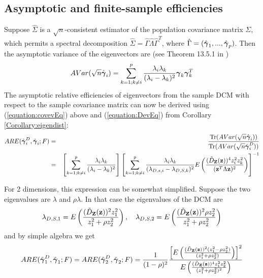 \documentclass[fleqn,11pt]{article}
\DeclareMathOperator*{\Tr}{Tr}
\begin{document}
\subsection{Asymptotic and finite-sample efficiencies}
Suppose $\hat\Sigma$ is a $\sqrt n$-consistent estimator of the population covariance matrix $\Sigma$, which permits a spectral decomposition $ \hat\Sigma = \hat\Gamma \hat\Lambda \hat\Gamma^T $, where $\hat\Gamma = (\hat{{\boldsymbol{\gamma}}}_1,...,\hat{{\boldsymbol{\gamma}}}_p)$. Then the asymptotic variance of the eigenvectors are (see Theorem 13.5.1 in \cite{anderson})
%
\begin{equation} \label{equation:covevEq}
AVar(\sqrt n\hat {{\boldsymbol{\gamma}}}_i) = \sum_{k=1; k \neq i}^p \frac{\lambda_i \lambda_k}{(\lambda_i - \lambda_k)^2} {\boldsymbol{\gamma}}_k {\boldsymbol{\gamma}}_k^T
\end{equation}
%
The asymptotic relative efficiencies of eigenvectors from the sample DCM with respect to the sample covariance matrix can now be derived using (\ref{equation:covevEq}) above and (\ref{equation:DevEq}) from Corollary \ref{Corollary:eigendist}:
%
\begin{eqnarray*}
ARE(\hat\bfgamma^D_i, \hat\bfgamma_i; F) &=& \frac{\Tr( AVar(\sqrt n\hat \bfgamma_i))}{\Tr( AVar(\sqrt n\hat \bfgamma^D_i))}\\
&=& \left[\sum_{k=1; k \neq i}^p \frac{\lambda_i \lambda_k}{(\lambda_i - \lambda_k)^2} \right] \left[ \sum_{k=1; k \neq i}^p \frac{\lambda_i \lambda_k }{(\lambda_{D,s,i} - \lambda_{D,S,k})^2} E \left( \frac{(\tilde D_\bfZ (\bfz))^4 z_i^2 z_k^2}{(\bfz^T \Lambda \bfz)^2} \right) \right]^{-1}
\end{eqnarray*}

For 2 dimensions, this expression can be somewhat simplified. Suppose the two eigenvalues are $\lambda$ and $\rho\lambda$. In that case the eigenvalues of the DCM are
%
$$ \lambda_{D,S,1} = E \left( \frac{(\tilde D_{\mathbf{Z}}({\bf{z}}))^2 z_1^2}{z_1^2 + \rho z_2^2} \right), \quad
\lambda_{D,S,2} = E \left( \frac{(\tilde D_{\mathbf{Z}}({\bf{z}}))^2 \rho z_2^2}{z_1^2 + \rho z_2^2} \right) $$
and by simple algebra we get
%
$$ ARE(\hat{{\boldsymbol{\gamma}}}^D_1, \hat{{\boldsymbol{\gamma}}}_1; F) = ARE(\hat{{\boldsymbol{\gamma}}}^D_2, \hat{{\boldsymbol{\gamma}}}_2; F) = \frac{1}{(1-\rho)^2} \frac{\left[ E \left( \frac{(\tilde D_{\mathbf{Z}}({\bf{z}}))^2 (z_1^2 - \rho z_2^2)}{(z_1^2 + \rho z_2^2)} \right) \right]^2 }{E \left( \frac{(\tilde D_{\mathbf{Z}}({\bf{z}}))^4 z_1^2z_2^2}{(z_1^2 + \rho z_2^2)^2}\right)} $$
\end{document}
